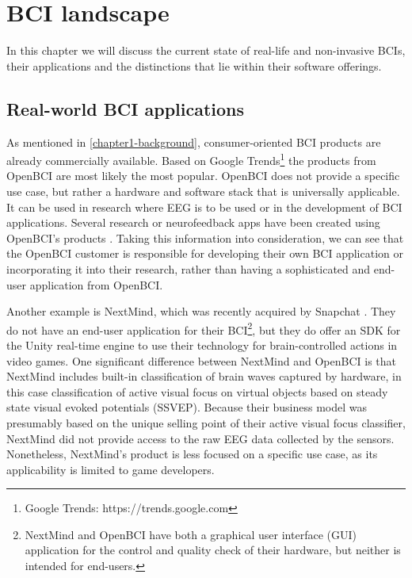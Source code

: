 \section{BCI landscape}
\label{chapter2-research-landscape}

In this chapter we will discuss the current state of real-life and non-invasive BCIs, their applications and the distinctions that lie within their software offerings.

\subsection{Real-world BCI applications}
\label{chapter2-real-world-bci-applications}

As mentioned in \autoref{chapter1-background}, consumer-oriented BCI products are already commercially available. Based on Google Trends\footnote{Google Trends: https://trends.google.com} the products from OpenBCI are most likely the most popular. OpenBCI does not provide a specific use case, but rather a hardware and software stack that is universally applicable. It can be used in research where EEG is to be used or in the development of BCI applications. Several research or neurofeedback apps have been created using OpenBCI's products \citep{openbci_openbci_nodate}. Taking this information into consideration, we can see that the OpenBCI customer is responsible for developing their own BCI application or incorporating it into their research, rather than having a sophisticated and end-user application from OpenBCI.

Another example is NextMind, which was recently acquired by Snapchat \citep{heater_snap_2022}. They do not have an end-user application for their BCI\footnote{NextMind and OpenBCI have both a graphical user interface (GUI) application for the control and quality check of their hardware, but neither is intended for end-users.}, but they do offer an SDK for the Unity real-time engine to use their technology for brain-controlled actions in video games. One significant difference between NextMind and OpenBCI is that NextMind includes built-in classification of brain waves captured by hardware, in this case classification of active visual focus on virtual objects based on steady state visual evoked potentials (SSVEP). Because their business model was presumably based on the unique selling point of their active visual focus classifier, NextMind did not provide access to the raw EEG data collected by the sensors. Nonetheless, NextMind's product is less focused on a specific use case, as its applicability is limited to game developers.

